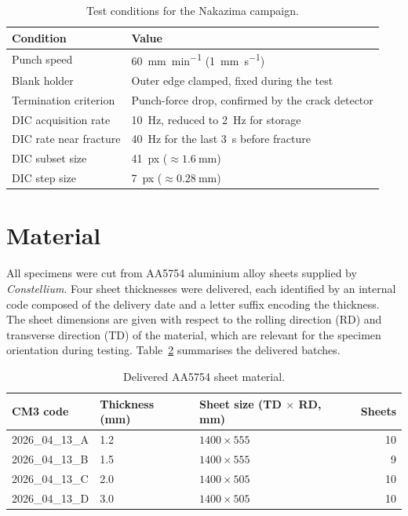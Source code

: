 \begin{table}[htbp]
\centering
\begin{tabular}{ll}
\toprule
Condition & Value \\
\midrule
Punch speed & \SI{60}{\milli\meter\per\minute} (\SI{1}{\milli\meter\per\second}) \\
Blank holder & Outer edge clamped, fixed during the test \\
Termination criterion & Punch-force drop, confirmed by the crack detector \\
DIC acquisition rate & \SI{10}{\hertz}, reduced to \SI{2}{\hertz} for storage \\
DIC rate near fracture & \SI{40}{\hertz} for the last \SI{3}{\second} before fracture \\
DIC subset size & 41~px ($\approx\SI{1.6}{\milli\meter}$) \\
DIC step size & 7~px ($\approx\SI{0.28}{\milli\meter}$) \\
\bottomrule
\end{tabular}
\caption{Test conditions for the Nakazima campaign.}
\label{tab:test_conditions}
\end{table}

\section{Material}

All specimens were cut from AA5754 aluminium alloy sheets supplied by
\textit{Constellium}. Four sheet thicknesses were delivered, each identified by an
internal code composed of the delivery date and a letter suffix encoding the
thickness. The sheet dimensions are given with respect to the rolling direction
(RD) and transverse direction (TD) of the material, which are relevant for the
specimen orientation during testing. Table~\ref{tab:material_delivery}
summarises the delivered batches.

\begin{table}[htbp]
\centering
\begin{tabular}{lllr}
\toprule
CM3 code & Thickness (\si{\milli\meter}) & Sheet size (TD $\times$ RD, \si{\milli\meter}) & Sheets \\
\midrule
2026\_04\_13\_A & 1.2 & $1400 \times 555$ & 10 \\
2026\_04\_13\_B & 1.5 & $1400 \times 555$ & 9 \\
2026\_04\_13\_C & 2.0 & $1400 \times 505$ & 10 \\
2026\_04\_13\_D & 3.0 & $1400 \times 505$ & 10 \\
\bottomrule
\end{tabular}
\caption{Delivered AA5754 sheet material.}
\label{tab:material_delivery}
\end{table}

